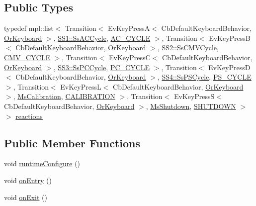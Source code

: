 \subsection*{Public Types}
\begin{DoxyCompactItemize}
\item 
typedef mpl\+::list$<$ Transition$<$ Ev\+Key\+PressA$<$ Cb\+Default\+Keyboard\+Behavior, \hyperlink{classsm__respira__1_1_1OrKeyboard}{Or\+Keyboard} $>$, \hyperlink{structsm__respira__1_1_1SS1_1_1SsACCycle}{S\+S1\+::\+Ss\+A\+C\+Cycle}, \hyperlink{structsm__respira__1_1_1StObserve_1_1AC__CYCLE}{A\+C\+\_\+\+C\+Y\+C\+LE} $>$, Transition$<$ Ev\+Key\+PressB$<$ Cb\+Default\+Keyboard\+Behavior, \hyperlink{classsm__respira__1_1_1OrKeyboard}{Or\+Keyboard} $>$, \hyperlink{structsm__respira__1_1_1SS2_1_1SsCMVCycle}{S\+S2\+::\+Ss\+C\+M\+V\+Cycle}, \hyperlink{structsm__respira__1_1_1StObserve_1_1CMV__CYCLE}{C\+M\+V\+\_\+\+C\+Y\+C\+LE} $>$, Transition$<$ Ev\+Key\+PressC$<$ Cb\+Default\+Keyboard\+Behavior, \hyperlink{classsm__respira__1_1_1OrKeyboard}{Or\+Keyboard} $>$, \hyperlink{structsm__respira__1_1_1SS3_1_1SsPCCycle}{S\+S3\+::\+Ss\+P\+C\+Cycle}, \hyperlink{structsm__respira__1_1_1StObserve_1_1PC__CYCLE}{P\+C\+\_\+\+C\+Y\+C\+LE} $>$, Transition$<$ Ev\+Key\+PressD$<$ Cb\+Default\+Keyboard\+Behavior, \hyperlink{classsm__respira__1_1_1OrKeyboard}{Or\+Keyboard} $>$, \hyperlink{structsm__respira__1_1_1SS4_1_1SsPSCycle}{S\+S4\+::\+Ss\+P\+S\+Cycle}, \hyperlink{structsm__respira__1_1_1StObserve_1_1PS__CYCLE}{P\+S\+\_\+\+C\+Y\+C\+LE} $>$, Transition$<$ Ev\+Key\+PressL$<$ Cb\+Default\+Keyboard\+Behavior, \hyperlink{classsm__respira__1_1_1OrKeyboard}{Or\+Keyboard} $>$, \hyperlink{classsm__respira__1_1_1MsCalibration}{Ms\+Calibration}, \hyperlink{structsm__respira__1_1_1StObserve_1_1CALIBRATION}{C\+A\+L\+I\+B\+R\+A\+T\+I\+ON} $>$, Transition$<$ Ev\+Key\+PressS$<$ Cb\+Default\+Keyboard\+Behavior, \hyperlink{classsm__respira__1_1_1OrKeyboard}{Or\+Keyboard} $>$, \hyperlink{classsm__respira__1_1_1MsShutdown}{Ms\+Shutdown}, \hyperlink{structsm__respira__1_1_1StObserve_1_1SHUTDOWN}{S\+H\+U\+T\+D\+O\+WN} $>$ $>$ \hyperlink{structsm__respira__1_1_1StObserve_a00306e36ae7345cee5a35abc4c88d9c5}{reactions}
\end{DoxyCompactItemize}
\subsection*{Public Member Functions}
\begin{DoxyCompactItemize}
\item 
void \hyperlink{structsm__respira__1_1_1StObserve_a3c1fe027b9396233475e8bd94fed6df7}{runtime\+Configure} ()
\item 
void \hyperlink{structsm__respira__1_1_1StObserve_a4aa08a7d0471453573d7ad4f4d6797ed}{on\+Entry} ()
\item 
void \hyperlink{structsm__respira__1_1_1StObserve_a1491b333b722854794cc61e55ff7015a}{on\+Exit} ()
\end{DoxyCompactItemize}
